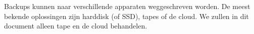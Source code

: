 Backups kunnen naar verschillende apparaten weggeschreven worden. De meest bekende oplossingen zijn harddisk (of SSD), tapes of de cloud. We zullen in dit document alleen tape en de cloud behandelen.

